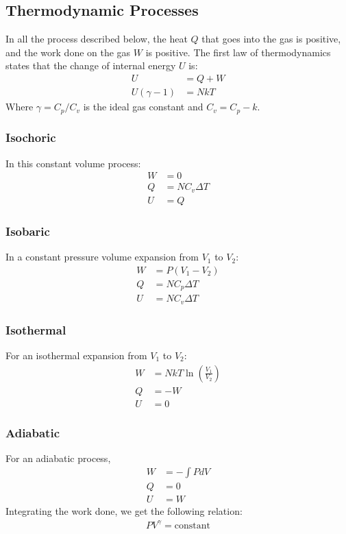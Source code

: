 \documentclass[a4paper]{article}
\begin{document}
\begin{multicols*}{2}
\subsection{Thermodynamic Processes}
In all the process described below, the heat $Q$ that goes into the gas is
positive, and the work done on the gas $W$ is positive. The first law of
thermodynamics states that the change of internal energy $U$ is:
\begin{align*}
  U &= Q + W \\
  U (\gamma - 1) &= NkT
\end{align*}
Where $\gamma = C_p/C_v$ is the ideal gas constant and $C_v = C_p - k$.
\subsubsection{Isochoric}
In this constant volume process:
\begin{align*}
  W &= 0 \\
  Q &= N C_v \Delta T \\
  U &= Q
\end{align*}
\subsubsection{Isobaric}
In a constant pressure volume expansion from $V_1$ to $V_2$:
\begin{align*}
  W &= P(V_1 - V_2) \\
  Q &= N C_p \Delta T \\
  U &= N C_v \Delta T
\end{align*}
\subsubsection{Isothermal}
For an isothermal expansion from $V_1$ to $V_2$:
\begin{align*}
  W &= NkT \ln \left( \frac{V_1}{V_2} \right) \\
  Q &= - W \\
  U &= 0
\end{align*}
\subsubsection{Adiabatic}
For an adiabatic process,
\begin{align*}
  W &= - \int P dV \\
  Q &= 0 \\
  U &= W
\end{align*}
Integrating the work done, we get the following relation:
\begin{align*}
  PV^{\gamma} = \text{constant}
\end{align*}

\end{multicols*}
\end{document}

